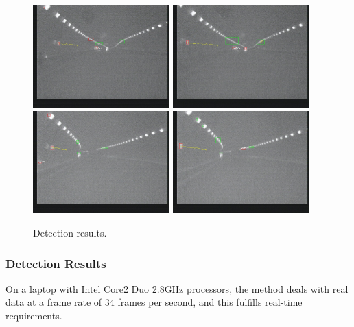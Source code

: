 \begin{figure}
{
\includegraphics[width=0.47\textwidth,bb=0 0 640 480]{veriRegTrjimg00626.jpg}
}
{
\includegraphics[width=0.47\textwidth,bb=0 0 640 480]{veriRegTrjimg00634.jpg}
}\\
{
\includegraphics[width=0.47\textwidth,bb=0 0 640 480]{veriRegTrjimg01072.jpg}
}
{
\includegraphics[width=0.47\textwidth,bb=0 0 640 480]{veriRegTrjimg01080.jpg}
}
\caption[Detection results]{Detection results.}
\label{ex1:sixs}
\end{figure}

\subsubsection{Detection Results} On a laptop with Intel Core2 Duo 2.8GHz processors, the method deals with real data at a frame rate of 34 frames per second, and this fulfills real-time requirements.


